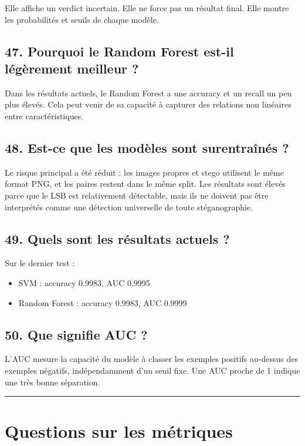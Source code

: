 \documentclass[11pt,a4paper]{article}
\begin{document}
Elle affiche un verdict incertain. Elle ne force pas un résultat final. Elle montre les probabilités et seuils de chaque modèle.

\subsection{47. Pourquoi le Random Forest est-il légèrement meilleur ?}

Dans les résultats actuels, le Random Forest a une accuracy et un recall un peu plus élevés. Cela peut venir de sa capacité à capturer des relations non linéaires entre caractéristiques.

\subsection{48. Est-ce que les modèles sont surentraînés ?}

Le risque principal a été réduit : les images propres et stego utilisent le même format PNG, et les paires restent dans le même split. Les résultats sont élevés parce que le LSB est relativement détectable, mais ils ne doivent pas être interprétés comme une détection universelle de toute stéganographie.

\subsection{49. Quels sont les résultats actuels ?}

Sur le dernier test :

\begin{itemize}
\item SVM : accuracy 0.9983, AUC 0.9995
\item Random Forest : accuracy 0.9983, AUC 0.9999
\end{itemize}

\subsection{50. Que signifie AUC ?}

L'AUC mesure la capacité du modèle à classer les exemples positifs au-dessus des exemples négatifs, indépendamment d'un seuil fixe. Une AUC proche de 1 indique une très bonne séparation.

\hrule

\section{Questions sur les métriques}
\end{document}
